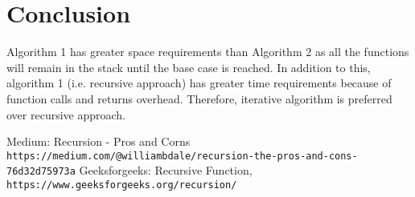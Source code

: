 \documentclass[12pt]{article}
\begin{document}
    \section{Conclusion}
    Algorithm 1 has greater space requirements than Algorithm 2 as all the functions will remain in the stack until the base case is reached. In addition to this, algorithm 1 (i.e. recursive approach) has greater time requirements because of function calls and returns overhead. Therefore, iterative algorithm is preferred over recursive approach.

    \begin{thebibliography}{}
    \bibitem{}
    Medium: Recursion - Pros and Corns
    \\\texttt{https://medium.com/@williambdale/recursion-the-pros-and-cons-76d32d75973a}
    \bibitem{}
    Geeksforgeeks: Recursive Function,
    \\\texttt{https://www.geeksforgeeks.org/recursion/}
    \end{thebibliography}
\end{document}
